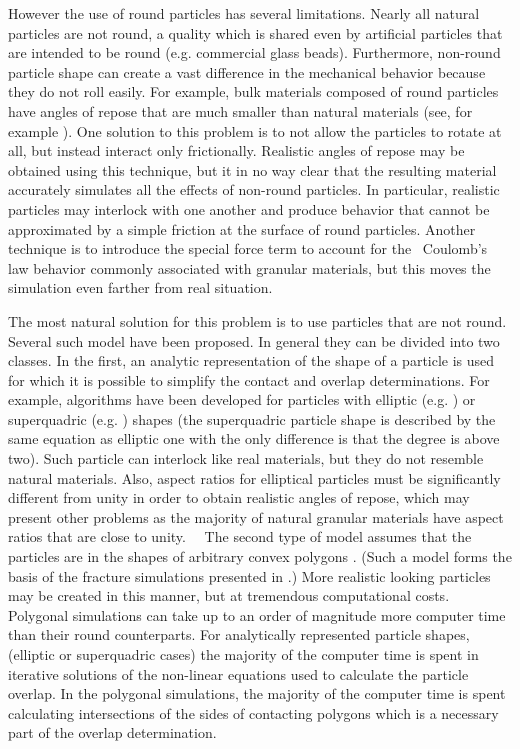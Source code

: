 \documentclass[granma]{svjour}
\begin{document}
However the use of round particles has several limitations. Near\-ly all
natural particles are not round, a quality which is shared even by artificial
particles that are intended to be round (e.g. commercial glass beads).
Furthermore, non-round particle shape can create a vast difference in the
mechanical behavior because they do not roll easily. For example, bulk
materials composed of round particles have angles of repose that are much
smaller than natural materials (see, for example \cite{posch93}). One
solution to this problem is to not allow the particles to rotate at all, but
instead interact only frictionally. Realistic angles of repose may be
obtained using this technique, but it in no way clear that the resulting
material accurately simulates all the effects of non-round particles. In
particular, realistic particles may interlock with one another and produce
behavior that cannot be approximated by a simple friction at the surface of
round particles. Another technique is to introduce the special force term
\cite{cund79} to account for the \ Coulomb's law behavior commonly
associated with granular materials, but this moves the simulation even
farther from real situation.

The most natural solution for this problem is to use particles that are not
round. Several such model have been proposed. In general they can be divided
into two classes. In the first, an analytic representation of the shape of a
particle is used for which it is possible to simplify the contact and overlap
determinations. For example, algorithms have been developed for particles
with elliptic (e.g. \cite{roth91,roth92,ting92,kohr93}) or superquadric (e.g.
\cite{will89,must93}) shapes (the superquadric particle shape is described by the
same equation as elliptic one with the only difference is that the
degree is above two). Such particle can interlock like real materials,
but they
do not resemble natural materials. Also, aspect ratios for elliptical
particles must be significantly different from unity in order to obtain
realistic angles of repose, which may present other problems as the majority
of natural granular materials have aspect ratios that are close to unity. \ \
The second type of model assumes that the particles are in the shapes of
arbitrary convex polygons \cite{hogue93,hop92,kohr95,till95,posch95}. (Such a
model forms the basis
of the fracture simulations presented in \cite{pota95a,pota95b,pota96a,pota96b}.) More
realistic looking particles may be created in this manner, but at tremendous
computational costs. Polygonal simulations can take up to an order of
magnitude more computer time than their round counterparts. For analytically
represented particle shapes, (elliptic or superquadric cases) the majority
of the computer time is spent in iterative solutions of the non-linear
equations used to calculate the particle overlap. In the polygonal
simulations, the majority of the computer time is spent calculating
intersections of the sides of contacting polygons which is a necessary part
of the overlap determination.
\end{document}
